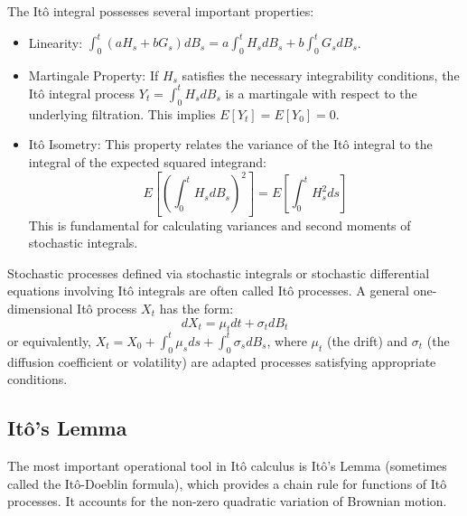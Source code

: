\documentclass[11pt,twoside,openright]{report}
\begin{document}
The Itô integral possesses several important properties:
\begin{itemize}
    \item Linearity: $\int_0^t (a H_s + b G_s) dB_s = a \int_0^t H_s dB_s + b \int_0^t G_s dB_s$.
    \item Martingale Property: If $H_s$ satisfies the necessary integrability conditions, the Itô integral process $Y_t = \int_0^t H_s dB_s$ is a martingale with respect to the underlying filtration. This implies $E[Y_t] = E[Y_0] = 0$.
    \item Itô Isometry: This property relates the variance of the Itô integral to the integral of the expected squared integrand:
    \begin{equation}
    E\left[ \left( \int_0^t H_s dB_s \right)^2 \right] = E\left[ \int_0^t H_s^2 ds \right]
    \label{eq:ito_isometry}
    \end{equation}
    This is fundamental for calculating variances and second moments of stochastic integrals.
\end{itemize}
Stochastic processes defined via stochastic integrals or stochastic differential equations involving Itô integrals are often called Itô processes. A general one-dimensional Itô process $X_t$ has the form:
\begin{equation}
dX_t = \mu_t dt + \sigma_t dB_t
\label{eq:ito_process}
\end{equation}
or equivalently, $X_t = X_0 + \int_0^t \mu_s ds + \int_0^t \sigma_s dB_s$, where $\mu_t$ (the drift) and $\sigma_t$ (the diffusion coefficient or volatility) are adapted processes satisfying appropriate conditions.

\subsection{Itô's Lemma}
\label{subsec:ito_lemma}

The most important operational tool in Itô calculus is Itô's Lemma (sometimes called the Itô-Doeblin formula), which provides a chain rule for functions of Itô processes. It accounts for the non-zero quadratic variation of Brownian motion.
\end{document}

